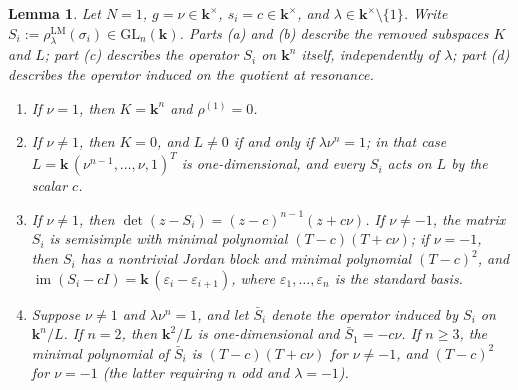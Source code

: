 \documentclass[11pt]{article}
\newtheorem{lemma}[theorem]{Lemma}
\theoremstyle{definition}
\theoremstyle{remark}
\newcommand{\GL}{\mathrm{GL}}
\newcommand{\kk}{\boldsymbol{k}}
\newcommand{\rLMl}{\rho^{\mathrm{LM}}_{\lambda}}
\begin{document}
\begin{lemma}\label{lem:rankone}
Let $N = 1$, $g = \nu \in \kk^{\times}$, $s_i = c \in \kk^{\times}$, and
$\lambda \in \kk^{\times} \setminus \{1\}$. Write
$S_i := \rLMl(\sigma_i) \in \GL_n(\kk)$. Parts (a) and (b) describe the
removed subspaces $K$ and $L$; part (c) describes the operator $S_i$ on
$\kk^n$ itself, independently of $\lambda$; part (d) describes the
operator induced on the quotient at resonance.
\begin{enumerate}
\item[(a)] If $\nu = 1$, then $K = \kk^n$ and $\rho^{(1)} = 0$.
\item[(b)] If $\nu \neq 1$, then $K = 0$, and $L \neq 0$ if and only if
$\lambda \nu^n = 1$; in that case
$L = \kk\,(\nu^{n-1}, \dots, \nu, 1)^{T}$ is one-dimensional, and
every $S_i$ acts on $L$ by the scalar $c$.
\item[(c)] If $\nu \neq 1$, then
$\det(z - S_i) = (z - c)^{n-1}(z + c\nu)$. If $\nu \neq -1$, the
matrix $S_i$ is semisimple with minimal polynomial
$(T - c)(T + c\nu)$; if $\nu = -1$, then $S_i$ has a nontrivial Jordan
block and minimal polynomial $(T - c)^2$, and
$\operatorname{im}(S_i - cI) = \kk\,(\varepsilon_i - \varepsilon_{i+1})$,
where $\varepsilon_1, \dots, \varepsilon_n$ is the standard basis.
\item[(d)] Suppose $\nu \neq 1$ and $\lambda \nu^n = 1$, and let
$\bar S_i$ denote the operator induced by $S_i$ on $\kk^n / L$. If
$n = 2$, then $\kk^2/L$ is one-dimensional and $\bar S_1 = -c\nu$. If
$n \geq 3$, the minimal polynomial of $\bar S_i$ is $(T - c)(T + c\nu)$
for $\nu \neq -1$, and $(T - c)^2$ for $\nu = -1$ (the latter requiring
$n$ odd and $\lambda = -1$).
\end{enumerate}
\end{lemma}
\end{document}
